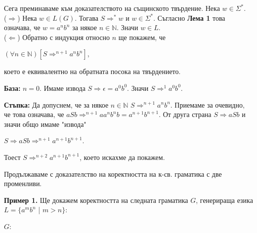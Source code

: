 \documentclass[openany]{book}
\begin{document}
    \vspace{10pt}

    Сега преминаваме към доказателството на същинското твърдение. Нека $w \in \Sigma^*$. \\
    ($\Rightarrow$) Нека $w \in L(G)$. Тогава $S \Rightarrow^* w$ и $w \in \Sigma^*$. Съгласно
    \textbf{Лема 1} това означава, че $w = a^nb^n$ за някое $n\in\mathbb{N}$. Значи 
    $w \in L$. \\
    ($\Leftarrow$) Обратно с индукция относно $n$ ще покажем, че \\
    \begin{center}
        $(\forall n \in \mathbb{N})[S \Rightarrow^{n+1} a^nb^n]$,
    \end{center}
    което е еквивалентно на обратната посока на твърдението.

    \vspace{5pt}

    \textbf{База:} $n = 0$. Имаме извода $S \Rightarrow \epsilon = a^0b^0$. Значи $S \Rightarrow^1 a^0b^0$. \\
    
    \vspace{5pt}

    \textbf{Стъпка:} Да допуснем, че за някое $n\in\mathbb{N}$ $S \Rightarrow^{n+1} a^nb^n$. Приемаме за 
    очевидно, че това означава, че $aSb \Rightarrow^{n+1} aa^nb^nb = a^{n+1}b^{n+1}$. От друга страна
    $S \Rightarrow aSb$ и значи общо имаме "извода" \\
    \begin{center}
        $S \Rightarrow aSb \Rightarrow^{n+1} a^{n+1}b^{n+1}$.
    \end{center} 
    Тоест $S \Rightarrow^{n+2} a^{n+1}b^{n+1}$, което искахме да покажем.
    
    \vspace{15pt}

    \hspace{15pt} Продължаваме с доказателство на коректността на к-св. граматика с две променливи.

    \vspace{15pt}

    \textbf{Пример 1.} Ще докажем коректността на следната граматика $G$, генерираща 
    езика $L = \{a^mb^n$ | $m > n\}$: \\
    \begin{center}
        $G$: 
    \end{center}
\end{document}
